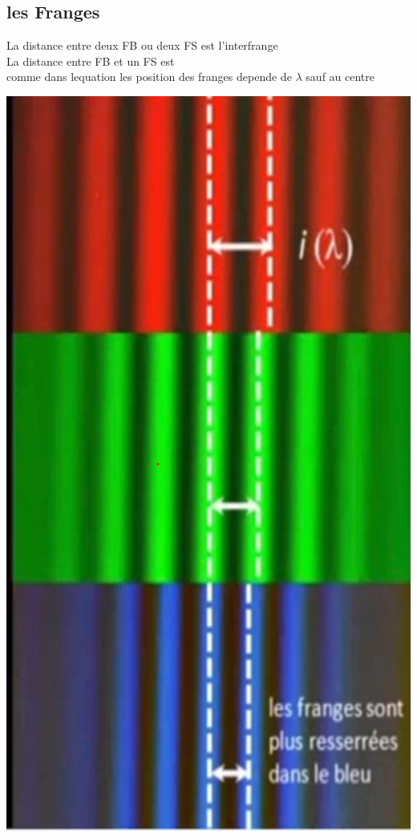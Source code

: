 \documentclass[12pt]{book}
\begin{document}
            \subsection{les Franges}
                \begin{minipage}{0.8\linewidth}
                    La distance entre deux FB ou deux FS est l'interfrange  \\
                    La distance entre FB et un FS est  \\
                    comme dans lequation les position des franges depende de $\lambda $ sauf au centre 
                \end{minipage}
                \begin{minipage}{0.2\linewidth}
                    \includegraphics[width=\linewidth]{pic/frangepos.png}
                \end{minipage}
\end{document}
